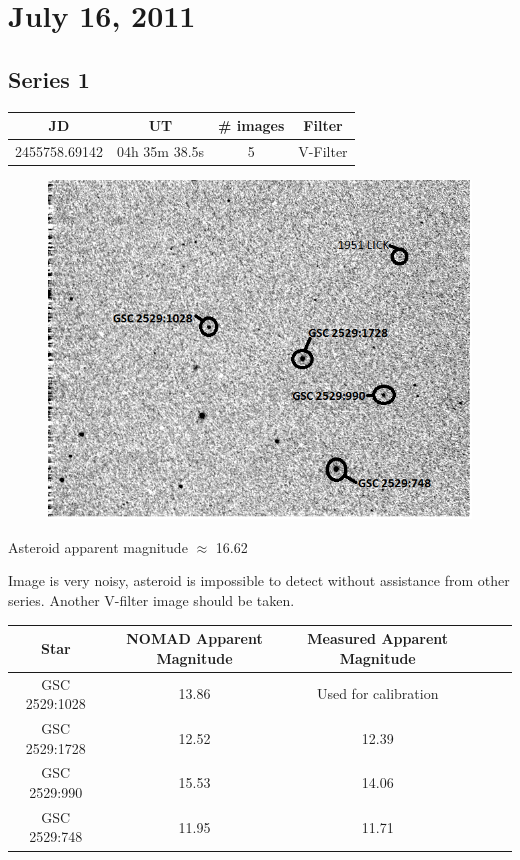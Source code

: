 \documentclass[11pt,a4paper]{article}
\begin{document}



\clearpage
\section{July 16, 2011}
\subsection{Series 1}
\begin{center}
\begin{tabular}{| c |  c | c | c | }
\hline
JD & UT & \# images & Filter \\ \hline
2455758.69142 & 04h 35m 38.5s & 5 & V-Filter \\ \hline
\end{tabular}
\end{center}

\begin{figure}[h!]
  \centering
   \includegraphics[width=\textwidth]{LSPR_annotated_images/Jul16Series1.png}
\end{figure}

Asteroid apparent magnitude $\approx$ 16.62

Image is very noisy, asteroid is impossible to detect without assistance from other series. Another V-filter image should be taken.

\begin{center}
\begin{tabular}{| c |  c | c | c | c |  c | }
\hline
Star & NOMAD Apparent Magnitude & Measured Apparent Magnitude \\ \hline \hline
GSC 2529:1028 & 13.86 & Used for calibration \\ \hline
GSC 2529:1728 & 12.52 & 12.39 \\ \hline
GSC 2529:990 & 15.53 & 14.06 \\ \hline
GSC 2529:748 & 11.95 & 11.71 \\ \hline
\end{tabular}
\end{center}
\end{document}
